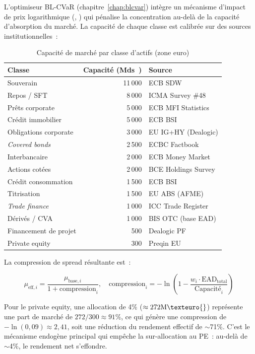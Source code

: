\documentclass[12pt, a4paper, twoside, openright]{report}
\theoremstyle{definition}
\begin{document}
L'optimiseur BL-CVaR (chapitre~\ref{chap:blcvar}) intègre un mécanisme d'impact de prix logarithmique (\citealt{kyle1985}, \citealt{almgren2001}) qui pénalise la concentration au-delà de la capacité d'absorption du marché. La capacité de chaque classe est calibrée sur des sources institutionnelles~:

\begin{table}[htbp]
\centering
\caption{Capacité de marché par classe d'actifs (zone euro)}
\label{tab:market-capacity}
\begin{tabular}{lrl}
\toprule
\textbf{Classe} & \textbf{Capacité (Mds~\texteuro{})} & \textbf{Source} \\
\midrule
Souverain & 11\,000 & ECB SDW \\
Repos / SFT & 8\,000 & ICMA Survey \#48 \\
Prêts corporate & 5\,000 & ECB MFI Statistics \\
Crédit immobilier & 5\,000 & ECB BSI \\
Obligations corporate & 3\,000 & EU IG+HY (Dealogic) \\
\textit{Covered bonds} & 2\,500 & ECBC Factbook \\
Interbancaire & 2\,000 & ECB Money Market \\
Actions cotées & 2\,000 & BCE Holdings Survey \\
Crédit consommation & 1\,500 & ECB BSI \\
Titrisation & 1\,500 & EU ABS (AFME) \\
\textit{Trade finance} & 1\,000 & ICC Trade Register \\
Dérivés / CVA & 1\,000 & BIS OTC (base EAD) \\
Financement de projet & 500 & Dealogic PF \\
Private equity & 300 & Preqin EU \\
\bottomrule
\end{tabular}
\end{table}

La compression de spread résultante est~:

\begin{equation}
\mu_{\text{eff},i} = \frac{\mu_{\text{base},i}}{1 + \text{compression}_i}, \quad
\text{compression}_i = -\ln\!\left(1 - \frac{w_i \cdot \text{EAD}_{\text{total}}}{\text{Capacité}_i}\right)
\label{eq:spread-compression}
\end{equation}

Pour le private equity, une allocation de 4\% ($\approx 272\text{M}\texteuro{}$) représente une part de marché de $272/300 \approx 91\%$, ce qui génère une compression de $-\ln(0{,}09) \approx 2{,}41$, soit une réduction du rendement effectif de $\sim$71\%. C'est le mécanisme endogène principal qui empêche la sur-allocation au PE~: au-delà de $\sim$4\%, le rendement net s'effondre.
\end{document}
